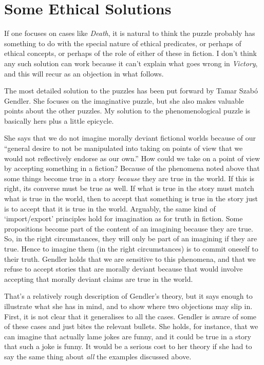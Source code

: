 \section{Some Ethical Solutions}
If one focuses on cases like \textit{Death}, it is natural to think the puzzle probably has something to do with the special nature of ethical predicates, or perhaps of ethical concepts, or perhaps of the role of either of these in fiction. I don't think any such solution can work because it can't explain what goes wrong in \textit{Victory}, and this will recur as an objection in what follows.

The most detailed solution to the puzzles has been put forward by Tamar Szab\'{o} Gendler. She focuses on the imaginative puzzle, but she also makes valuable points about the other puzzles. My solution to the phenomenological puzzle is basically hers plus a little epicycle. 

She says that we do not imagine morally deviant fictional worlds because of our ``general desire to not be manipulated into taking on points of view that we would not reflectively endorse as our own.'' How could we take on a point of view by accepting something in a fiction? Because of the phenomena noted above that some things become true in a story \textit{because }they are true in the world. If this is right, its converse must be true as well. If what is true in the story must match what is true in the world, then to accept that something is true in the story just is to accept that it is true in the world. Arguably, the same kind of `import/export' principles hold for imagination as for truth in fiction. Some propositions become part of the content of an imagining because they are true. So, in the right circumstances, they will only be part of an imagining if they are true. Hence to imagine them (in the right circumstances) is to commit oneself to their truth. Gendler holds that we are sensitive to this phenomena, and that we refuse to accept stories that are morally deviant because that would involve accepting that morally deviant claims are true in the world.

That's a relatively rough description of Gendler's theory, but it says enough to illustrate what she has in mind, and to show where two objections may slip in. First, it is not clear that it generalises to all the cases. Gendler is aware of some of these cases and just bites the relevant bullets. She holds, for instance, that we can imagine that actually lame jokes are funny, and it could be true in a story that such a joke is funny. It would be a serious cost to her theory if she had to say the same thing about \textit{all} the examples discussed above.

